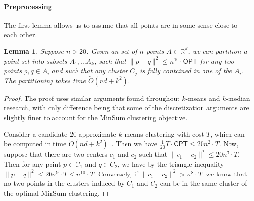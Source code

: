 \documentclass[10pt,a4paper]{amsart}
\newtheorem{lemma}[theorem]{Lemma}
\def \OPT    {\mdef{\mathsf{OPT}}}
\newcommand{\mdef}[1]{{\ensuremath{#1}}\xspace}  %
\begin{document}

\paragraph{Preprocessing}

The first lemma allows us to assume that all points are in some sense close to each other.
\begin{lemma}
\label{lem:preprocess}
    Suppose $n>20$.
    Given an set of $n$ points $A\subset \mathbb{R}^d$, we can partition a point set into subsets $A_1,\ldots A_k$, such that $\|p-q\|^2 \leq n^{10}\cdot \OPT$ for any two points $p,q\in A_i$ and such that any cluster $C_j$ is fully contained in one of the $A_i$. The partitioning takes time $\tilde{O}(nd+k^2)$.
\end{lemma}
\begin{proof}
The proof uses similar arguments found throughout $k$-means and $k$-median research, with only difference being that some of the discretization arguments are slightly finer to account for the MinSum clustering objective.

Consider a candidate $20$-approximate $k$-means clustering with cost $T$, which can be computed in time $\tilde{O}(nd+k^2)$~\cite{DraganovSS24}. Then we have $\frac{1}{20}T\cdot \OPT\leq 20 n^2 \cdot T$. Now, suppose that there are two centers $c_1$ and $c_2$ such that $\|c_1-c_2\|^2 \leq 20 n^{7} \cdot T$. Then for any point $p\in C_1$ and $q\in C_2$, we have by the triangle inequality $\|p-q\|^2 \leq 20n^{9}\cdot T\leq n^{10}\cdot T$. Conversely, if $\|c_1-c_2\|^2 > n^{8} \cdot T$, we know that no two points in the clusters induced by $C_1$ and $C_2$ can be in the same cluster of the optimal MinSum clustering. 
\end{proof}
\end{document}
